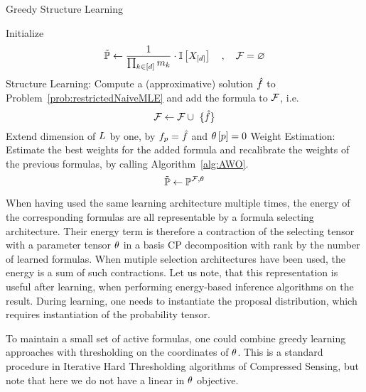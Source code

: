 \begin{algorithm}[hbt!]
\caption{Greedy Structure Learning}\label{alg:greedyStructureLearning}
\begin{algorithmic}
	\State Initialize
		\[ \tilde{\mathbb{P}} \leftarrow \frac{1}{\prod_{k\in[d]}m_{k}} \cdot \mathbb{I}\left[X_{[d]}\right] \quad, \quad \mathcal{F} = \varnothing \]
		\State Structure Learning: Compute a (approximative) solution $\hat{f}$ to Problem~\ref{prob:restrictedNaiveMLE} and add the formula to $\mathcal{F}$, i.e.
				\[ \formulaset \algdefsymbol \formulaset \cup \{\hat{\formula}\} \]
			Extend dimension of $L$ by one, by $f_{p}=\hat{f}$ and $\theta\left[p\right]=0$
		\State Weight Estimation: Estimate the best weights for the added formula and recalibrate the weights of the previous formulas, by calling Algorithm~\ref{alg:AWO}.
				\[ \tilde{\mathbb{P}} \leftarrow \mathbb{P}^{\mathcal{F}, \theta} \]
\EndWhile
\end{algorithmic}
\end{algorithm}



When having used the same learning architecture multiple times, the energy of the corresponding formulas are all representable by a formula selecting architecture.
Their energy term is therefore a contraction of the selecting tensor with a parameter tensor $\theta$ in a basis CP decomposition with rank by the number of learned formulas.
When mutiple selection architectures have been used, the energy is a sum of such contractions.
% 
Let us note, that this representation is useful after learning, when performing energy-based inference algorithms on the result.
During learning, one needs to instantiate the proposal distribution, which requires instantiation of the probability tensor.


\begin{remark}
	To maintain a small set of active formulas, one could combine greedy learning approaches with thresholding on the coordinates of $\theta$.
	This is a standard procedure in Iterative Hard Thresholding algorithms of Compressed Sensing, but note that here we do not have a linear in $\theta$ objective.
\end{remark}




